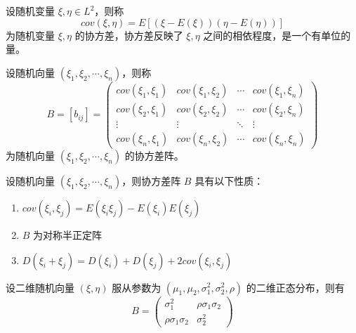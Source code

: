 \documentclass[12pt,a4paper]{amsart}
\begin{document}
\begin{definition}[协方差]
    设随机变量 $\xi, \eta \in L^2$，则称
    \begin{equation}
        cov(\xi, \eta) = E[(\xi - E(\xi))(\eta - E(\eta))]
    \end{equation}
    为随机变量 $\xi, \eta$ 的协方差，协方差反映了 $\xi, \eta$ 之间的相依程度，是一个有单位的量。
\end{definition}

\begin{definition}[协方差阵]
    设随机向量 $(\xi_1, \xi_2, \cdots, \xi_n)$，则称
    \begin{equation}
        B = [b_{ij}] = \begin{pmatrix}
            cov(\xi_1, \xi_1) & cov(\xi_1, \xi_2) & \cdots & cov(\xi_1, \xi_n) \\
            cov(\xi_2, \xi_1) & cov(\xi_2, \xi_2) & \cdots & cov(\xi_2, \xi_n) \\
            \vdots & \vdots & \ddots & \vdots \\
            cov(\xi_n, \xi_1) & cov(\xi_n, \xi_2) & \cdots & cov(\xi_n, \xi_n)
        \end{pmatrix}
    \end{equation}
    为随机向量 $(\xi_1, \xi_2, \cdots, \xi_n)$ 的协方差阵。
\end{definition}

\begin{proposition}[协方差阵的性质]
    设随机向量 $(\xi_1, \xi_2, \cdots, \xi_n)$，则协方差阵 $B$ 具有以下性质：
    \begin{enumerate}
        \item $cov(\xi_i, \xi_j) = E(\xi_i\xi_j) - E(\xi_i)E(\xi_j)$
        \item $B$ 为对称半正定阵
        \item $D(\xi_i+\xi_j) = D(\xi_i) + D(\xi_j) + 2 cov(\xi_i, \xi_j)$
    \end{enumerate}
\end{proposition}

\begin{proposition}[二维正态分布的协方差阵]
    设二维随机向量 $(\xi, \eta)$ 服从参数为 $(\mu_1, \mu_2, \sigma_1^2, \sigma_2^2, \rho)$ 的二维正态分布，则有
    \begin{equation}
        B = \begin{pmatrix}
            \sigma_1^2 & \rho\sigma_1\sigma_2 \\
            \rho\sigma_1\sigma_2 & \sigma_2^2
        \end{pmatrix}
    \end{equation}
\end{proposition}
\end{document}
